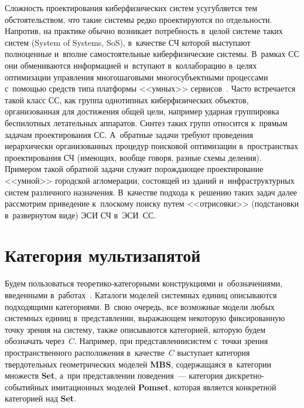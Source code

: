 \begin{multicols}{2}
Сложность проектирования киберфизических систем усугубляется тем 
обстоятельством, что такие системы редко проектируются по отдельности. 
Напротив, на практике обычно возникает потребность в~целой системе таких 
систем (System of Systems, SoS), в~качестве СЧ которой выступают 
полноценные и~вполне самостоятельные киберфизические системы. В~рамках 
СС они обмениваются информацией и~вступают 
в~коллаборацию в~целях оптимизации управления многошаговыми 
многосубъектными процессами с~помощью средств типа платформы 
<<умных>> сервисов~\cite{1-kov}. Часто встречается такой класс СС, как 
группа однотипных киберфизических объектов, организованная для 
достижения общей цели, например ударная группировка беспилотных 
летательных аппаратов. Синтез таких групп относится к~прямым задачам 
проектирования СС. А~обратные задачи требуют проведения иерархически 
организованных процедур поисковой оптимизации в~пространствах 
проектирования СЧ (имеющих, вообще говоря, разные схемы деления). 
Примером такой обратной задачи служит порождающее проектирование 
<<умной>> городской агломерации, состоящей из зданий и~инфраструктурных 
систем различного назначения. В~качестве подхода к~решению таких задач 
далее рассмотрим приведение к~плоскому поиску путем <<отрисовки>> 
(подстановки в~развернутом виде) ЭСИ СЧ в~ЭСИ~СС.

\section{Категория мультизапятой}

Будем пользоваться теоретико-категорными конструкциями и~обозначениями, 
введенными в~работах~\cite{5-kov, 13-kov}. Каталоги моделей системных 
единиц описываются подходящими категориями. В~свою очередь, все 
возможные модели любых системных единиц в~представлении, выражающем 
некоторую фиксированную точку зрения на систему, также описываются 
категорией, которую будем обозначать через~$C$. Например, при 
пред\-став\-ле\-нии\linebreak сис\-тем с~точки зрения пространственного расположения 
в~качестве~$C$ выступает категория твердотельных геометрических моделей 
\textbf{MBS}, содержащаяся в~категории множеств \textbf{Set}, а~при 
\mbox{представлении} поведения~--- категория дис\-крет\-но-со\-бы\-тий\-ных имитационных 
моделей \textbf{Pomset}, которая является конкретной категорией над 
\textbf{Set}.






\end{multicols}
